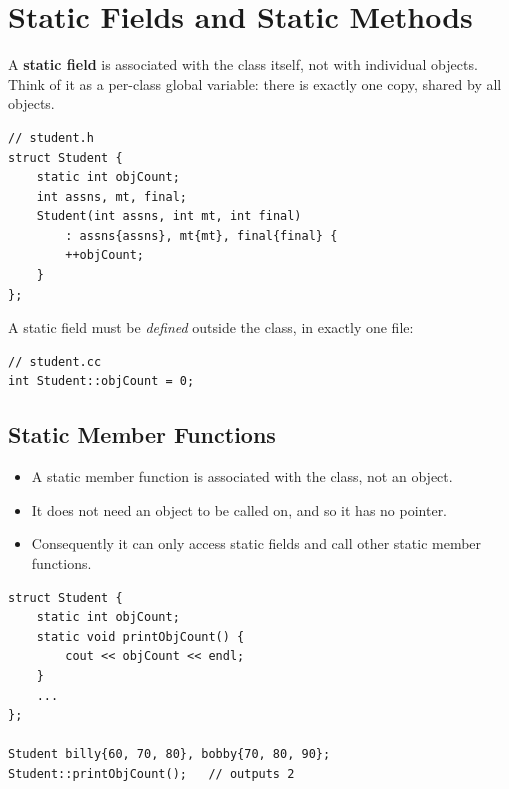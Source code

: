 \section{Static Fields and Static Methods}
\begin{definition}
A \textbf{static field} is associated with the class itself, not with
individual objects. Think of it as a per-class global variable: there is exactly
one copy, shared by all objects.
\end{definition}
\begin{lstlisting}[style=cpp]
// student.h
struct Student {
    static int objCount;
    int assns, mt, final;
    Student(int assns, int mt, int final)
        : assns{assns}, mt{mt}, final{final} {
        ++objCount;
    }
};
\end{lstlisting}
\begin{important}[C++ rule]
A static field must be \emph{defined} outside the class, in exactly one
 file:
\begin{lstlisting}[style=cpp]
// student.cc
int Student::objCount = 0;
\end{lstlisting}
\end{important}

\subsection{Static Member Functions}
\begin{itemize}
  \item A static member function is associated with the class, not an object.
  \item It does not need an object to be called on, and so it has no
         pointer.
  \item Consequently it can only access static fields and call other static
        member functions.
\end{itemize}
\begin{lstlisting}[style=cpp]
struct Student {
    static int objCount;
    static void printObjCount() {
        cout << objCount << endl;
    }
    ...
};

Student billy{60, 70, 80}, bobby{70, 80, 90};
Student::printObjCount();   // outputs 2
\end{lstlisting}
\begin{center}
\end{center}

